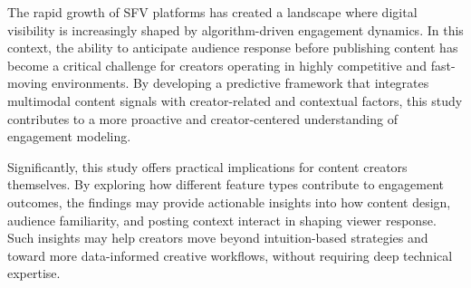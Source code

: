 





The rapid growth of SFV platforms has created a landscape where digital visibility is increasingly shaped by algorithm-driven engagement dynamics. In this context, the ability to anticipate audience response before publishing content has become a critical challenge for creators operating in highly competitive and fast-moving environments. By developing a predictive framework that integrates multimodal content signals with creator-related and contextual factors, this study contributes to a more proactive and creator-centered understanding of engagement modeling.

Significantly, this study offers practical implications for content creators themselves. By exploring how different feature types contribute to engagement outcomes, the findings may provide actionable insights into how content design, audience familiarity, and posting context interact in shaping viewer response. Such insights may help creators move beyond intuition-based strategies and toward more data-informed creative workflows, without requiring deep technical expertise.

